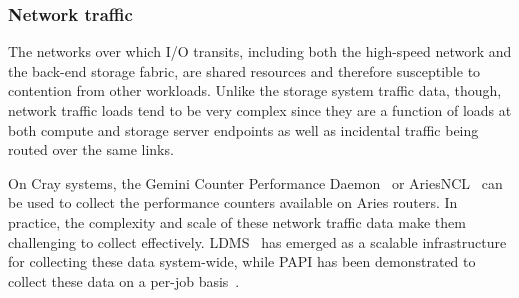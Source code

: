 \subsubsection{Network traffic} \label{sec:architecture/components/network}

The networks over which I/O transits, including both the high-speed network and the back-end storage fabric, are shared resources and therefore susceptible to contention from other workloads.
Unlike the storage system traffic data, though, network traffic loads tend to be very complex since they are a function of loads at both compute and storage server endpoints as well as incidental traffic being routed over the same links.

On Cray systems, the Gemini Counter Performance Daemon~\cite{Pedretti2013,Brandt2016} or AriesNCL~\cite{ariesncl} can be used to collect the performance counters available on Aries routers.
In practice, the complexity and scale of these network traffic data make them challenging to collect effectively.
LDMS~\cite{Agelastos2014ldms} has emerged as a scalable infrastructure for collecting these data system-wide, while PAPI has been demonstrated to collect these data on a per-job basis~\cite{Groves2017}.


